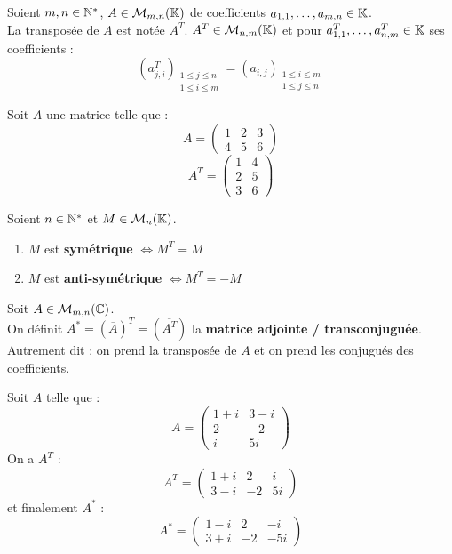 \begin{definition}[Transposée]
	Soient $m, n \in \mathbb{N}^*$, $A \in \mathcal{M}_{m, n}(\mathbb{K})$ de coefficients $a_{1,1}, \ldots, a_{m,n} \in \mathbb{K}$.
	\\
	La transposée de $A$ est notée $A^T$. $A^T \in \mathcal{M}_{n,m}(\mathbb{K})$ et pour $a^T_{1,1}, \ldots, a^T_{n,m} \in \mathbb{K}$ ses coefficients :
	\[ (a^T_{j,i})_{\substack{1 \leq j \leq n \\ 1 \leq i \leq m}} = (a_{i,j})_{\substack{1 \leq i \leq m \\ 1 \leq j \leq n}} \]
\end{definition}

\begin{example}
	Soit $A$ une matrice telle que :
	\[ 
	A = 
	\begin{pmatrix}
	1 & 2 & 3 \\
	4 & 5 & 6
	\end{pmatrix}
	\]
	\[
	A^T =
	\begin{pmatrix}
	1 & 4 \\
	2 & 5 \\
	3 & 6
	\end{pmatrix}
	\]
\end{example}

\begin{definition}
	Soient $n \in \mathbb{N}^*$ et $M \in \mathcal{M}_n(\mathbb{K})$.
	    \begin{enumerate}
    		\item $M$ est \textbf{symétrique} $\iff M^T = M$
    		\item $M$ est \textbf{anti-symétrique} $\iff M^T = -M$
    	\end{enumerate}
\end{definition}

\begin{definition}
	Soit $A \in \mathcal{M}_{m,n}(\mathbb{C})$.
	\\
	On définit $A^* = (\overline{A})^T = (\overline{A^T})$ la \textbf{matrice adjointe / transconjuguée}.
	Autrement dit : on prend la transposée de $A$ et on prend les conjugués des coefficients.
\end{definition}

\begin{example}
	Soit $A$ telle que :
	\[ A =
	\begin{pmatrix}
		1 + i & 3 - i \\
		2 & -2 \\
		i & 5i
	\end{pmatrix}
	\]
	On a $A^T$ :
	\[ 
	A^T = 
	\begin{pmatrix}
		1 + i  & 2 & i \\
		3 - i & -2 & 5i
	\end{pmatrix}
	\]
	et finalement $A^*$ :
	\[
	A^* =
	\begin{pmatrix}
		1 - i & 2 & -i \\
		3 + i & -2 & -5i
	\end{pmatrix}
	\]
\end{example}

